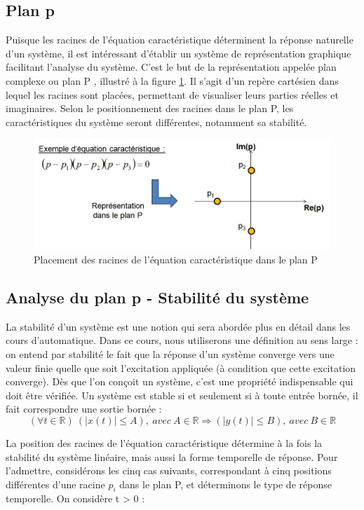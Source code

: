 	\subsection{Plan p}
	Puisque les racines de l'équation caractéristique déterminent la réponse naturelle d'un système, il est intéressant d'établir un système de représentation graphique facilitant l'analyse du système. C'est le but de la représentation appelée plan complexe ou plan P , illustré à la figure \ref{Fig:Plan_P}. Il s'agit d'un repère cartésien dans lequel les racines sont placées, permettant de visualiser leurs parties réelles et imaginaires. Selon le positionnement des racines dans le plan P, les caractéristiques du système seront différentes, notamment sa stabilité.
	\begin{figure}[h!]
		\centering
		\includegraphics[scale=0.5]{images/Plan_P.jpg} 
		\caption{Placement des racines de l'équation caractéristique dans le plan P}	
		\label{Fig:Plan_P}
	\end{figure}

	\subsection{Analyse du plan p - Stabilité du système}
	La stabilité d'un système est une notion qui sera abordée plus en détail dans les cours d'automatique. Dans ce cours, nous utiliserons une définition au sens large : on entend par stabilité le fait que la réponse d'un système converge vers une valeur finie quelle que soit l'excitation appliquée (à condition que cette excitation converge). Dès que l'on conçoit un système, c'est une propriété indispensable qui doit être vérifiée.
	Un système est stable si et seulement si à toute entrée bornée, il fait correspondre une sortie bornée :
	\begin{equation}
	(\forall t \in \mathbb{R})~(|x(t)| \leq A),~avec~A \in \mathbb{R} \Rightarrow (|y(t)| \leq B),~avec~B \in \mathbb{R}
	\end{equation}
	
	
	La position des racines de l'équation caractéristique détermine à la fois la stabilité du système linéaire, mais aussi la forme temporelle de réponse. Pour l'admettre, considérons les cinq cas suivants, correspondant à cinq positions différentes d'une racine $p_{i}$ dans le plan P, et déterminons le type de réponse temporelle. On considère t > 0 :
	
